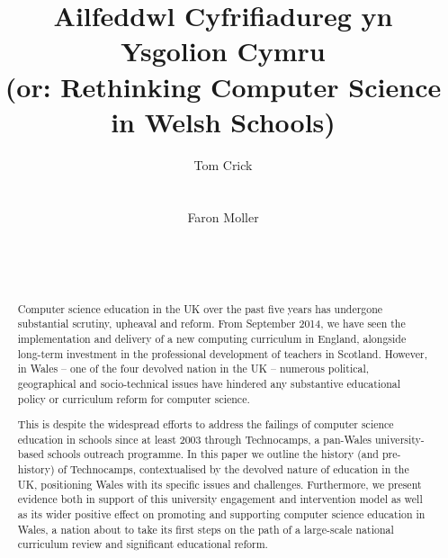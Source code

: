 \documentclass{sig-alternate}
\begin{document}
%



\title{Ailfeddwl Cyfrifiadureg yn Ysgolion Cymru\\(or: Rethinking Computer Science in Welsh Schools)}

 \author{
 \alignauthor
 Tom Crick\\
 \\
 \\
 \alignauthor
 Faron Moller\\
 \\
 \\
 \\
 }

\maketitle

\begin{abstract}
Computer science education in the UK over the past five years has
undergone substantial scrutiny, upheaval and reform. From September
2014, we have seen the implementation and delivery of a new computing
curriculum in England, alongside long-term investment in the
professional development of teachers in Scotland. However, in Wales --
one of the four devolved nation in the UK -- numerous political,
geographical and socio-technical issues have hindered any substantive
educational policy or curriculum reform for computer science.

This is despite the widespread efforts to address the failings of
computer science education in schools since at least 2003 through
Technocamps, a pan-Wales university-based schools outreach
programme. In this paper we outline the history (and pre-history) of
Technocamps, contextualised by the devolved nature of education in the
UK, positioning Wales with its specific issues and
challenges. Furthermore, we present evidence both in support of this
university engagement and intervention model as well as its wider
positive effect on promoting and supporting computer science education
in Wales, a nation about to take its first steps on the path of a
large-scale national curriculum review and significant educational
reform.
\end{abstract}
\end{document}
